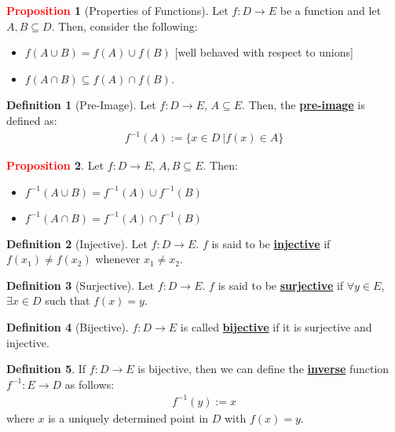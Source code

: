 \documentclass[11pt]{article}
\theoremstyle{definition}
\newcommand{\dfn}[1]{\textbf{{\underline{#1}}}}
\theoremstyle{definition}
\newtheorem{definition}{\textcolor{OliveGreen}{Definition}}
\newtheorem{prop}{\textcolor{red}{Proposition}}
\theoremstyle{remark}
\begin{document}
\begin{prop}[Properties of Functions]
	Let $f: D \rightarrow E$ be a function and let $A, B \subseteq D$. Then, consider the following: 
	\begin{itemize}[noitemsep]
		\item $f(A \cup B) = f(A) \cup f(B)$ [well behaved with respect to unions]
		\item $f( A \cap B) \subseteq f(A) \cap f(B)$. 
	\end{itemize}
\end{prop}

\begin{definition}[Pre-Image]
	Let $f: D \rightarrow E$, $A \subseteq E$. Then, the \dfn{pre-image} is defined as: 
	\begin{align}
		f^{-1}(A) := \{ x \in D\ | 	f(x) \in A \} 
	\end{align}
\end{definition}

\begin{prop}
	Let $f: D \rightarrow E$, $A, B \subseteq E$. Then: 
	\begin{itemize}[noitemsep]
		\item $f^{-1}(A \cup B) = f^{-1} (A) \cup f^{-1}(B) $
		\item $f^{-1}(A \cap B) = f^{-1}(A) \cap f^{-1}(B)$
	\end{itemize}
\end{prop}

\begin{definition}[Injective]
	Let $f: D \rightarrow E$. $f$ is said to be \dfn{injective} if $f(x_1) \neq f(x_2)$ whenever $x_1 \neq x_2$. 
\end{definition}

\begin{definition}[Surjective]
	Let $f: D \rightarrow E$. $f$ is said to be \dfn{surjective} if $\forall y \in E$, $\exists x \in D$ such that $f(x) = y$.
\end{definition}


\begin{definition}[Bijective]
	$f: D \rightarrow E$ is called \dfn{bijective} if it is surjective and injective.
\end{definition}

\begin{definition}
	If $f: D \rightarrow E$ is bijective, then we can define the \dfn{inverse} function $f^{-1}: E \rightarrow D$ as follows: 
	\begin{align} 
		f^{-1}(y) :=x	
	\end{align}
	where $x$ is a uniquely determined point in $D$ with $f(x)  = y$. 
\end{definition}
\end{document}
